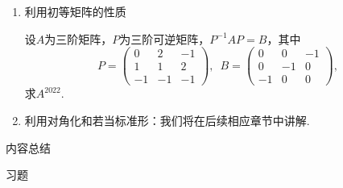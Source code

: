 \begin{enumerate}
          \begin{proof}

          \end{proof}

          \begin{example}
              已知数列$\{a_n\},\enspace\{b_n\}$满足$a_0=-1,\enspace b_0=3$，且
              \[\begin{cases}
                      a_n=3a_{n-1}+b_{n-1}+2^{n-1} \\
                      b_n=2a_{n-1}+4b_{n-1}+2^n
                  \end{cases}\]
              求$\{a_n\},\enspace\{b_n\}$的通项公式.
          \end{example}
          \begin{solution}

          \end{solution}

    \item 利用初等矩阵的性质
          \begin{example}
              设$A$为三阶矩阵，$P$为三阶可逆矩阵，$P^{-1}AP=B$，其中
              \[P=\begin{pmatrix}
                      0 & 2 & -1 \\ 1 & 1 & 2 \\ -1 & -1 & -1
                  \end{pmatrix},\enspace B=\begin{pmatrix}
                      0 & 0 & -1 \\ 0 & -1 & 0 \\ -1 & 0 & 0
                  \end{pmatrix},\]
              求$A^{2022}$.
          \end{example}
          \begin{solution}

          \end{solution}

    \item 利用对角化和若当标准形：我们将在后续相应章节中讲解.
\end{enumerate}

\vspace{2ex}
\centerline{\heiti \Large 内容总结}

\vspace{2ex}
\centerline{\heiti \Large 习题}

\vspace{2ex}
{\kaishu }
\begin{flushright}
    \kaishu

\end{flushright}

